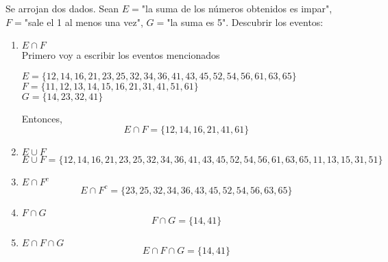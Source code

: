 \item Se arrojan dos dados. Sean $E=$"la suma de los números obtenidos es impar", $F=$"sale el 1 al menos una vez", $G=$"la suma es 5". Descubrir los eventos:
    \begin{enumerate}
        \item $E\cap F$\e\\
            Primero voy a escribir los eventos mencionados
            \begin{center}
                $E=\{12,14,16,21,23,25,32,34,36,41,43,45,52,54,56,61,63,65\}$\\
                $F=\{11,12,13,14,15,16,21,31,41,51,61\}$\\
                $G=\{14,23,32,41\}$
            \end{center}
            Entonces,
            \[E\cap F=\{12,14,16,21,41,61\}\]
        \item $E\cup F$
            \[E\cup F=\{12,14,16,21,23,25,32,34,36,41,43,45,52,54,56,61,63,65,11,13,15,31,51\}\]
        \item $E\cap F^c$
            \[E\cap F^c=\{23,25,32,34,36,43,45,52,54,56,63,65\}\]
        \item $F\cap G$
            \[F\cap G=\{14,41\}\]
        \item $E\cap F\cap G$
            \[E\cap F\cap G=\{14,41\}\]
    \end{enumerate}